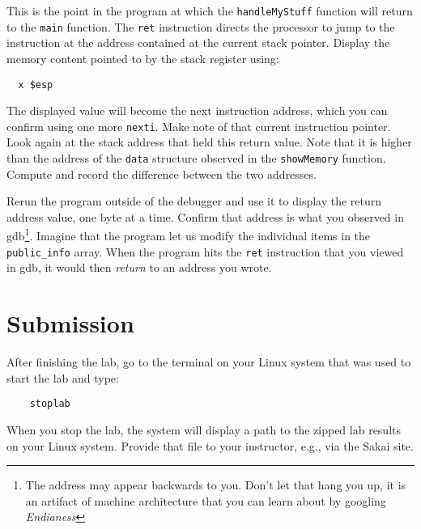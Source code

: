 This is the point in the program at which the {\tt handleMyStuff} function will return to the {\tt main}
function.  The {\tt ret} instruction directs the processor to jump to the instruction at the address
contained at the current stack pointer.  Display the memory content pointed to by the stack register using:
\begin{verbatim}
  x $esp
\end{verbatim}
\noindent  The displayed value will become the next instruction address, which you can confirm using one
more {\tt nexti}.   Make note of that current instruction pointer.  
Look again at the stack address that held this return value.  Note that it is higher
than the address of the {\tt data} structure observed in the {\tt showMemory} function.  Compute 
and record the difference between the two addresses.

Rerun the program outside of the debugger and use it to display the return address value, one byte at a time.
Confirm that address is what you observed in gdb\footnote{The address may appear backwards to you.  Don't let 
that hang you up, it is an artifact of machine architecture that you can learn about 
by googling \textit{Endianess}}.  Imagine that the program let us modify the individual 
items in the {\tt public\_info} array.  When the program hits the {\tt ret} instruction that you viewed
in gdb, it would then \textit{return} to an address you wrote.

\section{Submission}
After finishing the lab, go to the terminal on your Linux system that was used to start the lab and type:
\begin{verbatim}
    stoplab 
\end{verbatim}
When you stop the lab, the system will display a path to the zipped lab results on your Linux system.  Provide that file to 
your instructor, e.g., via the Sakai site.

\copyrightnotice


